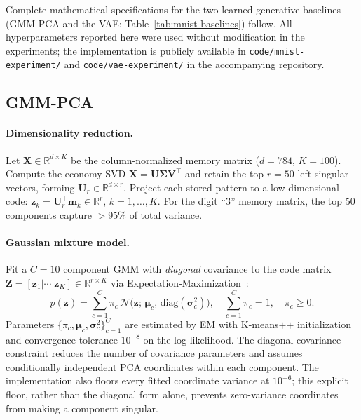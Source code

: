 Complete mathematical specifications for the two learned generative
baselines (GMM-PCA and the VAE; Table~\ref{tab:mnist-baselines}) follow.
All hyperparameters reported here were used without modification in the experiments;
the implementation is publicly available in \texttt{code/mnist-experiment/} and
\texttt{code/vae-experiment/} in the accompanying repository.

\subsection{GMM-PCA}\label{app:gmm-pca}

\paragraph{Dimensionality reduction.}
Let $\mathbf{X}\in\mathbb{R}^{d\times K}$ be the column-normalized memory matrix
($d{=}784$, $K{=}100$). Compute the economy SVD
$\mathbf{X}=\mathbf{U}\boldsymbol{\Sigma}\mathbf{V}^{\!\top}$ and retain the top
$r{=}50$ left singular vectors, forming $\mathbf{U}_{r}\in\mathbb{R}^{d\times r}$.
Project each stored pattern to a low-dimensional code:
$\mathbf{z}_{k}=\mathbf{U}_{r}^{\!\top}\mathbf{m}_{k}\in\mathbb{R}^{r}$, $k=1,\dots,K$.
For the digit ``3'' memory matrix, the top 50 components capture $>$95\% of total variance.

\paragraph{Gaussian mixture model.}
Fit a $C{=}10$ component GMM with \emph{diagonal} covariance to the code matrix
$\mathbf{Z}{=}[\mathbf{z}_1|\cdots|\mathbf{z}_K]\in\mathbb{R}^{r\times K}$ via
Expectation-Maximization~\cite{dempsterMaximumLikelihoodIncomplete1977}:
\begin{equation}
  p(\mathbf{z}) = \sum_{c=1}^{C}\pi_c\,
  \mathcal{N}\!\bigl(\mathbf{z};\,\boldsymbol{\mu}_c,\,\mathrm{diag}(\boldsymbol{\sigma}_c^2)\bigr),
  \quad \sum_{c=1}^{C}\pi_c=1,\quad \pi_c\geq 0.
\end{equation}
Parameters $\{\pi_c,\boldsymbol{\mu}_c,\boldsymbol{\sigma}_c^2\}_{c=1}^{C}$ are estimated
by EM with K-means$\texttt{++}$ initialization and convergence tolerance $10^{-8}$ on the
log-likelihood.
The diagonal-covariance constraint reduces the number of covariance parameters
and assumes conditionally independent PCA coordinates within each component.
The implementation also floors every fitted coordinate variance at $10^{-6}$;
this explicit floor, rather than the diagonal form alone, prevents zero-variance
coordinates from making a component singular.


